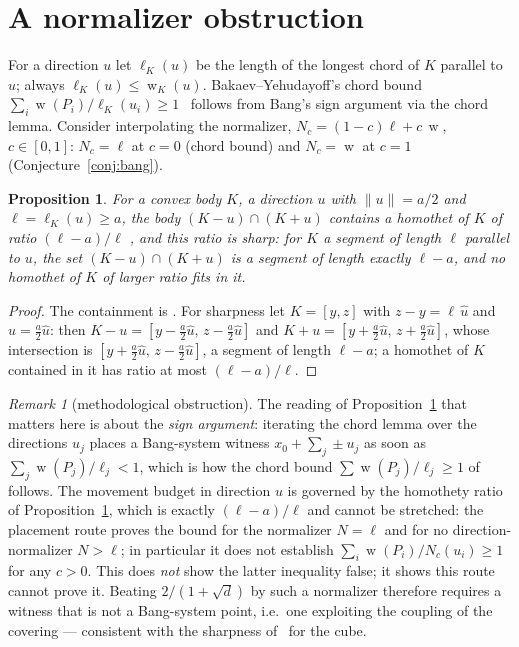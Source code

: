 \documentclass[11pt,reqno]{amsart}
\theoremstyle{plain}
\newtheorem{proposition}[theorem]{Proposition}
\theoremstyle{definition}
\theoremstyle{remark}
\newtheorem{remark}[theorem]{Remark}
\DeclareMathOperator{\wid}{w}
\begin{document}
\section{A normalizer obstruction}\label{sec:nogo}
For a direction $u$ let $\ell_K(u)$ be the length of the longest chord of $K$
parallel to $u$; always $\ell_K(u)\le\wid_K(u)$. Bakaev--Yehudayoff's chord bound
$\sum_i\wid(P_i)/\ell_K(u_i)\ge1$~\cite{BY26} follows from Bang's sign argument
via the chord lemma. Consider interpolating the normalizer,
$N_c=(1-c)\ell+c\,\wid$, $c\in[0,1]$: $N_c=\ell$ at $c=0$ (chord bound) and
$N_c=\wid$ at $c=1$ (Conjecture~\ref{conj:bang}).
\begin{proposition}\label{thm:nogo}
For a convex body $K$, a direction $u$ with $\|u\|=a/2$ and
$\ell=\ell_K(u)\ge a$, the body $(K-u)\cap(K+u)$ contains a homothet of $K$ of
ratio $(\ell-a)/\ell$ \cite[Lem.~2.3]{Verreault}, and this ratio is sharp: for
$K$ a segment of length $\ell$ parallel to $u$, the set $(K-u)\cap(K+u)$ is a
segment of length exactly $\ell-a$, and no homothet of $K$ of larger ratio fits
in it.
\end{proposition}
\begin{proof}
The containment is \cite[Lem.~2.3]{Verreault}. For sharpness let
$K=[y,z]$ with $z-y=\ell\,\hat u$ and $u=\tfrac a2\hat u$: then
$K-u=[y-\tfrac a2\hat u,\,z-\tfrac a2\hat u]$ and
$K+u=[y+\tfrac a2\hat u,\,z+\tfrac a2\hat u]$, whose intersection is
$[y+\tfrac a2\hat u,\,z-\tfrac a2\hat u]$, a segment of length $\ell-a$; a
homothet of $K$ contained in it has ratio at most $(\ell-a)/\ell$.
\end{proof}
\begin{remark}[methodological obstruction]\label{rem:nogo}
The reading of Proposition~\ref{thm:nogo} that matters here is about the
\emph{sign argument}: iterating the chord lemma over the directions $u_j$
places a Bang-system witness $x_0+\sum_j\pm u_j$ as soon as
$\sum_j\wid(P_j)/\ell_j<1$, which is how the chord bound
$\sum\wid(P_j)/\ell_j\ge1$ of~\cite{BY26} follows. The movement budget in
direction $u$ is governed by the homothety ratio of
Proposition~\ref{thm:nogo}, which is exactly $(\ell-a)/\ell$ and cannot be
stretched: the placement route proves the bound for the normalizer
$N=\ell$ and for no direction-normalizer $N>\ell$; in particular it does not
establish $\sum_i\wid(P_i)/N_c(u_i)\ge1$ for any $c>0$. This does \emph{not}
show the latter inequality false; it shows this route cannot prove it. Beating
$2/(1+\sqrt d)$ by such a normalizer therefore requires a witness that is not a
Bang-system point, i.e.\ one exploiting the coupling of the covering ---
consistent with the sharpness of~\cite{BY26} for the cube.
\end{remark}
\end{document}
